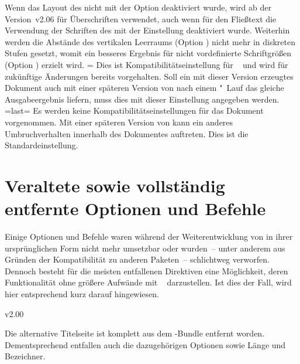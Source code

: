 \begin{Entity}{}
\begin{Declaration}
\begin{DeclareValues}
  Wenn das Layout des \CDs nicht mit der Option  deaktiviert 
  wurde, wird ab der Version~v2.06 für Überschriften \OpenSans verwendet, auch 
  wenn für den Fließtext die Verwendung der Schriften des \CDs mit der 
  Einstellung  deaktiviert wurde. Weiterhin werden die 
  Abstände des vertikalen Leerraums (Option ) nicht 
  mehr in diskreten Stufen gesetzt, womit ein besseres Ergebnis für nicht 
  vordefinierte Schriftgrößen (Option ) erzielt wird.
=
  Dies ist Kompatibilitätseinstellung für \TUDScript~\vTUDScript{} und wird für 
  zukünftige Änderungen bereits vorgehalten. Soll ein mit dieser Version 
  erzeugtes Dokument auch mit einer späteren Version von \TUDScript nach einem 
  "~Lauf das gleiche Ausgabeergebnis liefern, muss dies mit 
  dieser Einstellung angegeben werden.
\itemval=last=
  Es werden keine Kompatibilitätseinstellungen für das Dokument vorgenommen. 
  Mit einer späteren Version von \TUDScript kann ein anderes Umbruchverhalten 
  innerhalb des Dokumentes auftreten. Dies ist die Standardeinstellung.%
\end{DeclareValues}
\end{Declaration}



\section{%
  Veraltete sowie vollständig entfernte Optionen und Befehle%
  \label{sec:cessations}%
}
%
\begin{NoIndexDefault}
Einige Optionen und Befehle waren während der Weiterentwicklung von \TUDScript
in ihrer ursprünglichen Form nicht mehr umsetzbar oder wurden~-- unter anderem 
aus Gründen der Kompatibilität zu anderen Paketen~-- schlichtweg verworfen. 
Dennoch besteht für die meisten entfallenen Direktiven eine Möglichkeit, deren 
Funktionalität ohne größere Aufwände mit \TUDScript~\vTUDScript{} darzustellen. 
Ist dies der Fall, wird hier entsprechend kurz darauf hingewiesen.



\begin{Cessations}{v2.00}
\begin{Cessation}
  {}
\begin{Cessation}
  {}
\begin{Cessation}
  {}
\begin{Cessation}
  {}
\printdeclarationlist
%
Die alternative Titelseite ist komplett aus dem \TUDScript-Bundle entfernt 
worden. Dementsprechend entfallen auch die dazugehörigen Optionen sowie Länge 
und Bezeichner.
\end{Cessation}
\end{Cessation}
\end{Cessation}
\end{Cessation}


\end{Cessations}
\end{NoIndexDefault}
\end{Entity}
